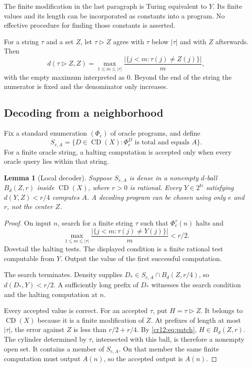 \documentclass[11pt,letterpaper]{article}
\theoremstyle{plain}
\newtheorem{lemma}[theorem]{Lemma}
\theoremstyle{definition}
\theoremstyle{remark}
\numberwithin{equation}{section}
\newcommand{\N}{\mathbb N}
\newcommand{\Cantor}{2^{\N}}
\newcommand{\CD}{\operatorname{CD}}
\newcommand{\patch}{\mathbin{\triangleright}}
\begin{document}
The finite modification in the last paragraph is Turing equivalent to $Y$.
Its finite values and its length can be incorporated as constants into a
program. No effective procedure for finding those constants is asserted.

For a string $\tau$ and a set $Z$, let $\tau\patch Z$ agree with $\tau$ below
$|\tau|$ and with $Z$ afterwards. Then
\begin{equation}\label{cr12:eq:patch}
 d(\tau\patch Z,Z)=
 \max_{1\le m\le|\tau|}
 \frac{|\{j<m:\tau(j)\ne Z(j)\}|}{m},
\end{equation}
with the empty maximum interpreted as $0$. Beyond the end of the string the
numerator is fixed and the denominator only increases.

\subsection{Decoding from a neighborhood}
Fix a standard enumeration $(\Phi_e)$ of oracle programs, and define
\[
 S_{e,A}=\{D\in\CD(X):\Phi_e^D\text{ is total and equals }A\}.
\]
For a finite oracle string, a halting computation is accepted only when every
oracle query lies within that string.

\begin{lemma}[Local decoder]\label{cr12:lem:decoder}
Suppose $S_{e,A}$ is dense in a nonempty $d$-ball $B_d(Z,r)$ inside $\CD(X)$,
where $r>0$ is rational. Every $Y\in\Cantor$ satisfying $d(Y,Z)<r/4$ computes
$A$. A decoding program can be chosen using only $e$ and $r$, not the center $Z$.
\end{lemma}
\begin{proof}
On input $n$, search for a finite string $\tau$ such that $\Phi_e^\tau(n)$
halts and
\begin{equation}\label{cr12:eq:search}
 \max_{1\le m\le|\tau|}
 \frac{|\{j<m:\tau(j)\ne Y(j)\}|}{m}<r/2.
\end{equation}
Dovetail the halting tests. The displayed condition is a finite rational test
computable from $Y$. Output the value of the first successful computation.

The search terminates. Density supplies
$D_*\in S_{e,A}\cap B_d(Z,r/4)$, so $d(D_*,Y)<r/2$. A sufficiently long prefix
of $D_*$ witnesses the search condition and the halting computation at $n$.

Every accepted value is correct. For an accepted $\tau$, put
$H=\tau\patch Z$. It belongs to $\CD(X)$ because it is a finite modification
of $Z$. At prefixes of length at most $|\tau|$, the error against $Z$ is less
than $r/2+r/4$. By \eqref{cr12:eq:patch}, $H\in B_d(Z,r)$. The cylinder determined
by $\tau$, intersected with this ball, is therefore a nonempty open set.
It contains a member of $S_{e,A}$. On that member the same finite computation
must output $A(n)$, so the accepted output is $A(n)$.
\end{proof}
\end{document}

